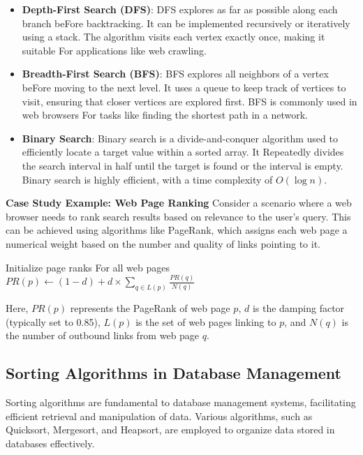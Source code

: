 \documentclass[12pt]{book} %
\begin{document}
\begin{itemize}
    \item \textbf{Depth-First Search (DFS)}: DFS explores as far as possible along each branch beFore backtracking. It can be implemented recursively or iteratively using a stack. The algorithm visits each vertex exactly once, making it suitable For applications like web crawling.
    
    \item \textbf{Breadth-First Search (BFS)}: BFS explores all neighbors of a vertex beFore moving to the next level. It uses a queue to keep track of vertices to visit, ensuring that closer vertices are explored first. BFS is commonly used in web browsers For tasks like finding the shortest path in a network.
    
    \item \textbf{Binary Search}: Binary search is a divide-and-conquer algorithm used to efficiently locate a target value within a sorted array. It Repeatedly divides the search interval in half until the target is found or the interval is empty. Binary search is highly efficient, with a time complexity of $O(\log n)$.
\end{itemize}

\textbf{Case Study Example: Web Page Ranking}
Consider a scenario where a web browser needs to rank search results based on relevance to the user's query. This can be achieved using algorithms like PageRank, which assigns each web page a numerical weight based on the number and quality of links pointing to it.
\FloatBarrier
\begin{algorithm}
\caption{PageRank Algorithm}
\begin{algorithmic}[1]
\State Initialize page ranks For all web pages
\Repeat
{}
\State $PR(p) \leftarrow (1-d) + d \times \sum_{q \in L(p)} \frac{PR(q)}{N(q)}$
\EndFor
{}
\end{algorithmic}
\end{algorithm}
\FloatBarrier
Here, $PR(p)$ represents the PageRank of web page $p$, $d$ is the damping factor (typically set to 0.85), $L(p)$ is the set of web pages linking to $p$, and $N(q)$ is the number of outbound links from web page $q$.

\FloatBarrier
\subsection{Sorting Algorithms in Database Management}
Sorting algorithms are fundamental to database management systems, facilitating efficient retrieval and manipulation of data. Various algorithms, such as Quicksort, Mergesort, and Heapsort, are employed to organize data stored in databases effectively.
\end{document}
